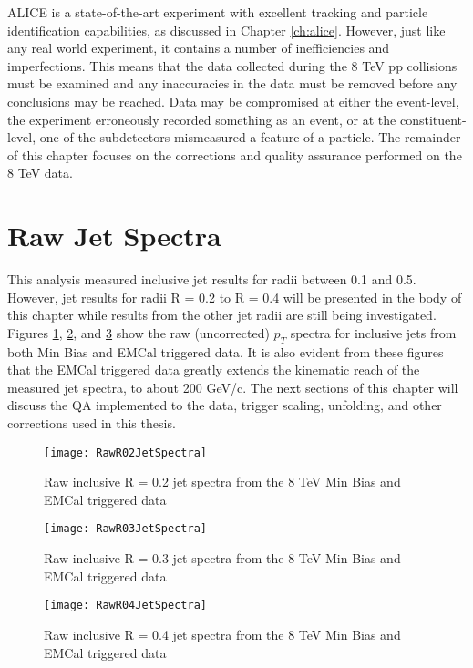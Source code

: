 \noindent

ALICE is a state-of-the-art experiment with excellent tracking and particle identification capabilities, as discussed in Chapter \ref{ch:alice}.  However, just like any real world experiment, it contains a number of inefficiencies and imperfections.  This means that the data collected during the 8 TeV pp collisions must be examined and any inaccuracies in the data must be removed before any conclusions may be reached.  Data may be compromised at either the event-level, the experiment erroneously recorded something as an event, or at the constituent-level, one of the subdetectors mismeasured a feature of a particle.  The remainder of this chapter focuses on the corrections and quality assurance performed on the 8 TeV data.


\section{Raw Jet Spectra}

This analysis measured inclusive jet results for radii between 0.1 and 0.5.  However, jet results for radii R = 0.2 to R = 0.4 will be presented in the body of this chapter while results from the other jet radii are still being investigated.  Figures \ref{fig:rawjetR02}, \ref{fig:rawjetR03}, and \ref{fig:rawjetR04} show the raw (uncorrected) $p_{T}$ spectra for inclusive jets from both Min Bias and EMCal triggered data.  It is also evident from these figures that the EMCal triggered data greatly extends the kinematic reach of the measured jet spectra, to about 200 GeV/c.  The next sections of this chapter will discuss the QA implemented to the data, trigger scaling, unfolding, and other corrections used in this thesis. 

\begin{figure}[h]
\texttt{[image: RawR02JetSpectra]}
\centering
\caption{Raw inclusive R = 0.2 jet spectra from the 8 TeV Min Bias and EMCal triggered data}
\label{fig:rawjetR02}
\end{figure}
\begin{figure}[h]
\texttt{[image: RawR03JetSpectra]}
\centering
\caption{Raw inclusive R = 0.3 jet spectra from the 8 TeV Min Bias and EMCal triggered data}
\label{fig:rawjetR03}
\end{figure}
\begin{figure}[h]
\texttt{[image: RawR04JetSpectra]}
\centering
\caption{Raw inclusive R = 0.4 jet spectra from the 8 TeV Min Bias and EMCal triggered data}
\label{fig:rawjetR04}
\end{figure}

